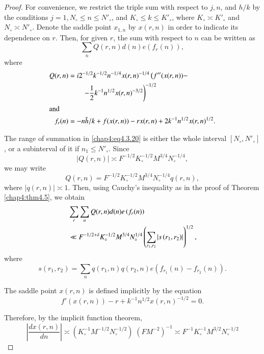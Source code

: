 \begin{proof}
For convenience, we restrict the triple sum with respect to $j,n$, and $h/k$ by the conditions $j=1, N_\circ\leq n\leq N'_\circ$, and $K_\circ\leq k\leq K'_\circ$, where $K_\circ\asymp K'_\circ$ and $N_\circ\asymp N'_\circ$. Denote the saddle point $x_{1,n}$ by $x(r,n)$ in order to indicate its dependence on $r$. Then, for given $r$, the sum with respect to $n$ can be written as 
\begin{equation}\label{chap4:eq4.3.20}
\sum\limits_nQ(r,n)d(n)e\left(f_r(n)\right),
\end{equation}
where\pageoriginale
\begin{align}
Q(r,n) &= i2^{-1/2}k^{-1/2}n^{-1/4}x(r,n)^{-1/4}\left(f''(x (r,n))-\right.\label{chap4:eq4.3.21}\\
&\qquad \left.-\frac{1}{2}k^{-1}n^{1/2}x(r,n)^{-3/2} \right)^{-1/2}\notag\\
\intertext{and}
f_r(n) &= -n\bar{h}/k+f(x(r,n))-rx(r,n)+2k^{-1}n^{1/2}x (r,n)^{1/2}.\label{chap4:eq4.3.22}
\end{align}

The range of summation in \eqref{chap4:eq4.3.20} is either the whole interval $[N_\circ,N'_\circ]$, or a subinterval of it if $n_1\leq N'_\circ$. Since
$$
|Q(r,n)|\asymp F^{-1/2}K_\circ^{-1/2}M^{3/4}N_\circ^{-1/4},
$$
we may write
$$
Q(r,n)=F^{-1/2}K_\circ^{-1/2}M^{3/4}N_\circ^{-1/4}q(r,n),
$$
where $|q(r,n)|\asymp 1$. Then, using Cauchy's inequality as in the proof of Theorem \ref{chap4:thm4.5}, we obtain
\begin{align}
& \sum\limits_r\sum\limits_n Q(r,n)d(n)e\left(f_r(n) \right)\label{chap4:eq4.3.23}\\
& \ll F^{-1/2+\delta}K_\circ^{-1/2}M^{3/4}N_\circ^{1/4}\left(\sum\limits_{r_1,r_2}\left| s\left(r_1,r_2\right)\right|\right)^{1/2},\notag
\end{align}
where
$$
s\left(r_1,r_2\right)=\sum\limits_nq\left(r_1,n\right)q\left(r_2,n\right)e \left( f_{r_1}(n)-f_{r_2}(n)\right).
$$

The saddle point $x(r,n)$ is defined implicitly by the equation 
\begin{equation}\label{chap4:eq4.3.24}
f'(x(r,n))-r+k^{-1}n^{1/2}x(r,n)^{-1/2}=0.
\end{equation}

Therefore, by the implicit function theorem,
\begin{equation}\label{chap4:eq4.3.25}
\left|\frac{dx(r,n)}{dn}\right|\asymp \left(K_\circ^{-1}M^{-1/2}N_\circ^{-1/2} \right)\;\left(FM^{-2}\right)^{-1}\asymp F^{-1}K_\circ^{-1}M^{3/2}N_\circ^{-1/2}
\end{equation}


\end{proof}

